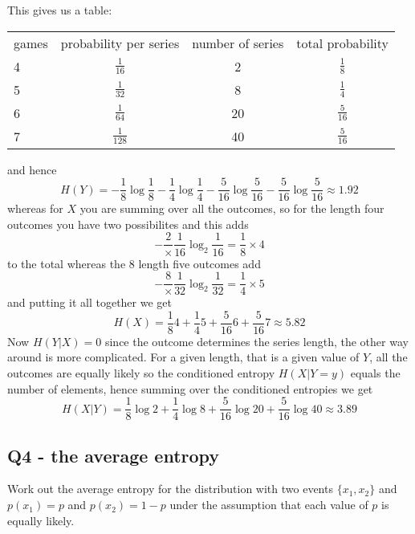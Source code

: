 \documentclass[12pt]{article}
\begin{document}
This gives us a table:
\begin{center}
  \begin{tabular}{l|ccc}
games&probability per series&number of series&total probability\\[7pt]
4& $\frac{1}{16}$  &2& $\frac{1}{8}$ \\[7pt]
5& $\frac{1}{32}$  &8& $\frac{1}{4}$ \\[7pt]
6& $\frac{1}{64}$  &20&$\frac{5}{16}$\\[7pt]
7& $\frac{1}{128}$ &40&$\frac{5}{16}$
  \end{tabular}
\end{center}
and hence
\begin{equation}
  H(Y)=-\frac{1}{8}\log{\frac{1}{8}}-\frac{1}{4}\log{\frac{1}{4}}-\frac{5}{16}\log{\frac{5}{16}}-\frac{5}{16}\log{\frac{5}{16}}\approx 1.92
\end{equation}
whereas for $X$ you are summing over all the outcomes, so for the length four outcomes you have two possibilites and this adds
\begin{equation}
  -\frac{2}\times \frac{1}{16}\log_2{\frac{1}{16}}=\frac{1}{8}\times 4
\end{equation}
to the total whereas the 8 length five outcomes add
\begin{equation}
  -\frac{8}\times \frac{1}{32}\log_2{\frac{1}{32}}=\frac{1}{4}\times 5
\end{equation}
and putting it all together we get
\begin{equation}
  H(X)=\frac{1}{8}4+\frac{1}{4}5+\frac{5}{16}6+\frac{5}{16}7\approx 5.82
\end{equation}
Now $H(Y|X)=0$ since the outcome determines the series length, the
other way around is more complicated. For a given length, that is a given value of $Y$, all the
outcomes are equally likely so the conditioned entropy $H(X|Y=y)$ equals the number of elements, hence summing over the conditioned entropies we get
\begin{equation}
  H(X|Y)=\frac{1}{8}\log{2}+\frac{1}{4}\log{8}+\frac{5}{16}\log{20}+\frac{5}{16}\log{40}\approx 3.89
\end{equation}

\subsection*{Q4 - the average entropy}

Work out the average entropy for the distribution with two events
$\{x_1,x_2\}$ and $p(x_1)=p$ and $p(x_2)=1-p$ under the assumption
that each value of $p$ is equally likely.
\end{document}
